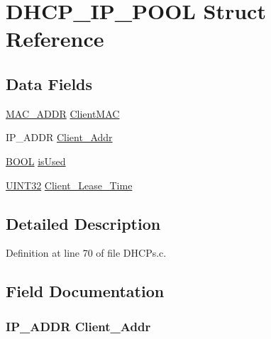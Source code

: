 \hypertarget{struct_d_h_c_p___i_p___p_o_o_l}{}\section{D\+H\+C\+P\+\_\+\+I\+P\+\_\+\+P\+O\+O\+L Struct Reference}
\label{struct_d_h_c_p___i_p___p_o_o_l}
\subsection*{Data Fields}
\begin{DoxyCompactItemize}
\item 
\hyperlink{_stack_tsk_8h_ad13a037a42c866ac11db19330b840589}{M\+A\+C\+\_\+\+A\+D\+D\+R} \hyperlink{struct_d_h_c_p___i_p___p_o_o_l_a1a848c890fc2e770e93568912cf5de1f}{Client\+M\+A\+C}
\item 
I\+P\+\_\+\+A\+D\+D\+R \hyperlink{struct_d_h_c_p___i_p___p_o_o_l_abfcb2f02048ad070c14df73f4468ddae}{Client\+\_\+\+Addr}
\item 
\hyperlink{_generic_type_defs_8h_a54d65c7fa62e62c9754371e42f5111b9}{B\+O\+O\+L} \hyperlink{struct_d_h_c_p___i_p___p_o_o_l_a77e19c8d1c90a2f35d90335fbf5a2c5e}{is\+Used}
\item 
\hyperlink{_generic_type_defs_8h_a1720f33f59b583f0c2ed071815623a86}{U\+I\+N\+T32} \hyperlink{struct_d_h_c_p___i_p___p_o_o_l_aac2996e6608bc831a1c087a5ca414695}{Client\+\_\+\+Lease\+\_\+\+Time}
\end{DoxyCompactItemize}


\subsection{Detailed Description}


Definition at line 70 of file D\+H\+C\+Ps.\+c.



\subsection{Field Documentation}
\hypertarget{struct_d_h_c_p___i_p___p_o_o_l_abfcb2f02048ad070c14df73f4468ddae}{}
\subsubsection[{Client\+\_\+\+Addr}]{\setlength{\rightskip}{0pt plus 5cm}I\+P\+\_\+\+A\+D\+D\+R Client\+\_\+\+Addr}\label{struct_d_h_c_p___i_p___p_o_o_l_abfcb2f02048ad070c14df73f4468ddae}


